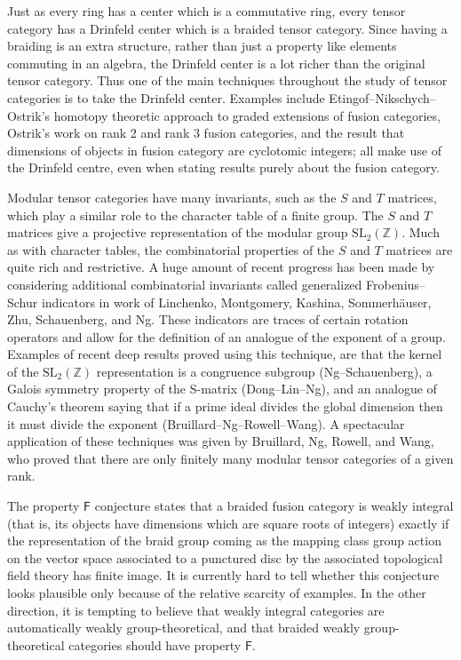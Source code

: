 \documentclass[12pt]{article}
\begin{document}
Just as every ring has a center which is a commutative ring, every tensor category has a Drinfeld center which is a braided tensor category. Since having a braiding is an extra structure, rather than just a property like elements commuting in an algebra, the Drinfeld center is a lot richer than the original tensor category. Thus one of the main techniques throughout the study of tensor  categories is to take the Drinfeld center.  Examples include Etingof--Nikschych--Ostrik's homotopy theoretic approach to graded extensions of fusion categories, Ostrik's work on rank 2 and rank 3 fusion categories, and the result that dimensions of objects in fusion category are cyclotomic integers; all make use of the Drinfeld centre, even when stating results purely about the fusion category.

Modular tensor categories have many invariants, such as the $S$ and $T$ matrices, which play a similar role to the character table of a finite group. The $S$ and $T$ matrices give a projective representation of the modular group $\mathrm{SL}_2(\mathbb{Z})$.  Much as with character tables, the combinatorial properties of the $S$ and $T$ matrices are quite rich and restrictive. A huge amount of recent progress has been made by considering additional combinatorial invariants called generalized Frobenius--Schur indicators in work of Linchenko, Montgomery, Kashina, Sommerh\"auser, Zhu, Schauenberg, and Ng. These indicators are traces of certain rotation operators and allow for the definition of an analogue of the exponent of a group. Examples of recent deep results proved using this technique, are that the kernel of the $\mathrm{SL}_2(\mathbb{Z})$ representation is a congruence subgroup (Ng--Schauenberg), a Galois symmetry property of the S-matrix (Dong--Lin--Ng), and an analogue of Cauchy's theorem saying that if a prime ideal divides the global dimension then it must divide the exponent (Bruillard--Ng--Rowell--Wang). A spectacular application of these techniques was given by Bruillard, Ng, Rowell, and Wang, who proved that there are only finitely many modular tensor categories of a given rank.

The property $\mathsf F$ conjecture states that a braided fusion category is weakly integral (that is, its objects have dimensions which are square roots of integers) exactly if the representation of the braid group coming as the mapping class group action on the vector space associated to a punctured disc by the associated topological field theory has finite image. It is currently hard to tell whether this conjecture looks plausible only because of the relative scarcity of examples. In the other direction, it is tempting to believe that weakly integral categories are automatically weakly group-theoretical, and that braided weakly group-theoretical categories should have property $\mathsf F$.
\end{document}
